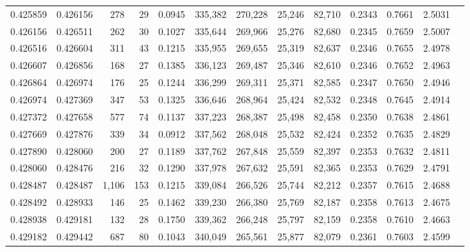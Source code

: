 \begin{tabular}{rrrrrrrrrrrrr}
0.425859 & 0.426156 &   278 &  29 &                                     0.0945 & 335,382 & 270,228 &  25,246 &  82,710 & 0.2343 & 0.7661 & 2.5031 \\
0.426156 & 0.426511 &   262 &  30 &                                     0.1027 & 335,644 & 269,966 &  25,276 &  82,680 & 0.2345 & 0.7659 & 2.5007 \\
0.426516 & 0.426604 &   311 &  43 &                                     0.1215 & 335,955 & 269,655 &  25,319 &  82,637 & 0.2346 & 0.7655 & 2.4978 \\
0.426607 & 0.426856 &   168 &  27 &                                     0.1385 & 336,123 & 269,487 &  25,346 &  82,610 & 0.2346 & 0.7652 & 2.4963 \\
0.426864 & 0.426974 &   176 &  25 &                                     0.1244 & 336,299 & 269,311 &  25,371 &  82,585 & 0.2347 & 0.7650 & 2.4946 \\
0.426974 & 0.427369 &   347 &  53 &                                     0.1325 & 336,646 & 268,964 &  25,424 &  82,532 & 0.2348 & 0.7645 & 2.4914 \\
0.427372 & 0.427658 &   577 &  74 &                                     0.1137 & 337,223 & 268,387 &  25,498 &  82,458 & 0.2350 & 0.7638 & 2.4861 \\
0.427669 & 0.427876 &   339 &  34 &                                     0.0912 & 337,562 & 268,048 &  25,532 &  82,424 & 0.2352 & 0.7635 & 2.4829 \\
0.427890 & 0.428060 &   200 &  27 &                                     0.1189 & 337,762 & 267,848 &  25,559 &  82,397 & 0.2353 & 0.7632 & 2.4811 \\
0.428060 & 0.428476 &   216 &  32 &                                     0.1290 & 337,978 & 267,632 &  25,591 &  82,365 & 0.2353 & 0.7629 & 2.4791 \\
0.428487 & 0.428487 & 1,106 & 153 &                                     0.1215 & 339,084 & 266,526 &  25,744 &  82,212 & 0.2357 & 0.7615 & 2.4688 \\
0.428492 & 0.428933 &   146 &  25 &                                     0.1462 & 339,230 & 266,380 &  25,769 &  82,187 & 0.2358 & 0.7613 & 2.4675 \\
0.428938 & 0.429181 &   132 &  28 &                                     0.1750 & 339,362 & 266,248 &  25,797 &  82,159 & 0.2358 & 0.7610 & 2.4663 \\
0.429182 & 0.429442 &   687 &  80 &                                     0.1043 & 340,049 & 265,561 &  25,877 &  82,079 & 0.2361 & 0.7603 & 2.4599 \\

\end{tabular}
